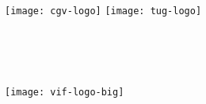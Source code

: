\begin{titlepage}
	\begin{addmargin}[-1cm]{-3cm}
    \begin{center}
        \large  

        \hfill

        \vfill

        \begingroup
            \color{Maroon}\spacedallcaps{\myTitle} \\ \bigskip
        \endgroup

        \spacedlowsmallcaps{\myName}

        \vfill

				\texttt{[image: cgv-logo]}
				\hspace{1cm}
				\texttt{[image: tug-logo]} \\ 
				\bigskip

        \myDegree \\ 
        \medskip   
        \myFaculty \\
        \myUni \\ 
        \bigskip
        \bigskip
        \bigskip

				\centering
				\texttt{[image: vif-logo-big]}\\
				\medskip
				\myCooperation
				\bigskip
				

        \myTime

        \vfill                      

    \end{center}  
  \end{addmargin}       
\end{titlepage}   
